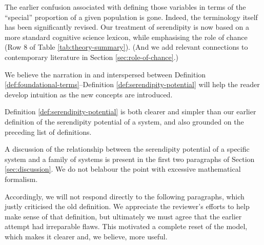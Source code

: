 
The earlier confusion associated with defining those variables in
terms of the ``special'' proportion of a given population is gone.
Indeed, the terminology itself has been significantly revised.  Our
treatment of serendipity is now based on a more standard cognitive
science lexicon, while emphasising the role of chance (Row 8 of Table
\ref{tab:theory-summary}).  (And we add relevant connections to
contemporary literature in Section \ref{sec:role-of-chance}.)


We believe the narration in and interspersed between Definition
\ref{def:foundational-terms}--Definition
\ref{def:serendipity-potential} will help the reader develop intuition
as the new concepts are introduced.


Definition \ref{def:serendipity-potential} is both
clearer and simpler than our earlier definition of the
serendipity potential of a system, and also grounded on the
preceding list of definitions.


A discussion of the relationship between the serendipity potential of
a specific system and a family of systems is present in the first two
paragraphs of Section \ref{sec:discussion}.  We do not belabour the
point with excessive mathematical formalism.

Accordingly, we will not respond directly to the following paragraphs,
which justly criticised the old definition.  We appreciate the
reviewer's efforts to help make sense of that definition, but
ultimately we must agree that the earlier attempt had irreparable
flaws.  This motivated a complete reset of the model, which makes it
clearer and, we believe, more useful.

